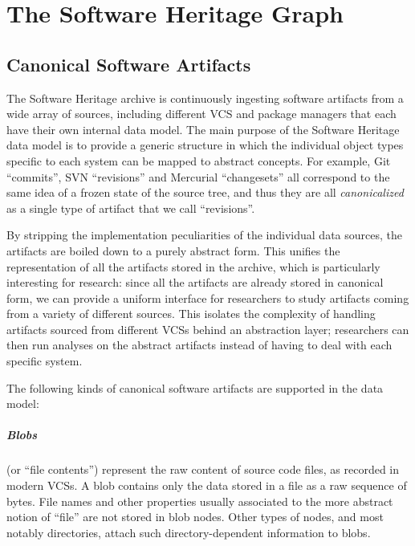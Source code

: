 \chapter{The Software Heritage Graph}%
\label{chp:swh-model}


\section{Canonical Software Artifacts}%
\label{sec:swh-artifacts}

The Software Heritage archive is continuously ingesting software artifacts from
a wide array of sources, including different VCS and package managers that
each have their own internal data model. The main purpose of the Software
Heritage data model is to provide a generic structure in which the individual
object types specific to each system can be mapped to abstract concepts. For
example, Git ``commits'', SVN ``revisions'' and Mercurial ``changesets'' all
correspond to the same idea of a frozen state of the source tree, and thus they
are all \emph{canonicalized} as a single type of artifact that we call
``revisions''.

By stripping the implementation peculiarities of the individual data sources,
the artifacts are boiled down to a purely abstract form. This unifies the
representation of all the artifacts stored in the archive, which is
particularly interesting for research: since all the artifacts are already
stored in canonical form, we can provide a uniform interface for researchers
to study artifacts coming from a variety of different sources. This isolates
the complexity of handling artifacts sourced from different \glspl{VCS} behind
an abstraction layer; researchers can then run analyses on the abstract
artifacts instead of having to deal with each specific system.

The following kinds of canonical software artifacts are supported in the data
model:

\begin{figure}\centering
{}
\end{figure}
\paragraph{\textbf{Blobs}} (or ``file contents'') represent the raw content of
source code files, as recorded in modern \glspl{VCS}. A blob contains only the
data stored in a file as a raw sequence of bytes. File names and other
properties usually associated to the more abstract notion of ``file'' are
not stored in blob nodes. Other types of nodes, and most notably
directories, attach such directory-dependent information to blobs.

